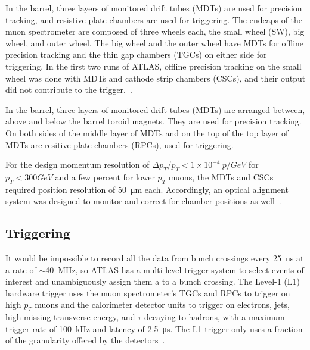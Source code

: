 In the barrel, three layers of monitored drift tubes (MDTs) are used for precision tracking, and resistive plate chambers are used for triggering. The endcaps of the muon spectrometer are composed of three wheels each, the small wheel (SW), big wheel, and outer wheel. The big wheel and the outer wheel have MDTs for offline precision tracking and the thin gap chambers (TGCs) on either side for triggering. In the first two runs of ATLAS, offline precision tracking on the small wheel was done with MDTs and cathode strip chambers (CSCs), and their output did not contribute to the trigger.~\cite{atlas_muon_spectrometer_tdr}. 

In the barrel, three layers of monitored drift tubes (MDTs) are arranged between, above and below the barrel toroid magnets. They are used for precision tracking. On both sides of the middle layer of  MDTs and on the top of the top layer of MDTs are resitive plate chambers (RPCs), used for triggering.

For the design momentum resolution of $\Delta p_T / p_T < 1\times10^{-4}~p / GeV$ for $p_T < 300 GeV$ and a few percent for lower $p_T$ muons, the MDTs and CSCs required position resolution of \SI{50}{\micro\meter} each. Accordingly, an optical alignment system was designed to monitor and correct for chamber positions as well~\cite{atlas_muon_spectrometer_tdr, aefsky_optical_2008}.


\subsection{Triggering}

It would be impossible to record all the data from bunch crossings every \SI{25}{\nano\second} at a rate of $\sim$\SI{40}{MHz}, so ATLAS has a multi-level trigger system to select events of interest and unambiguously assign them a to a bunch crossing. The Level-1 (L1) hardware trigger uses the muon spectrometer's TGCs and RPCs to trigger on high $p_T$ muons and the calorimeter detector units to trigger on electrons, jets, high missing transverse energy, and $\tau$ decaying to hadrons, with a maximum trigger rate of \SI{100}{kHz} and latency of \SI{2.5}{\micro\second}. The L1 trigger only uses a fraction of the granularity offered by the detectors~\cite{atlas_l1_trigger_tdr}.

